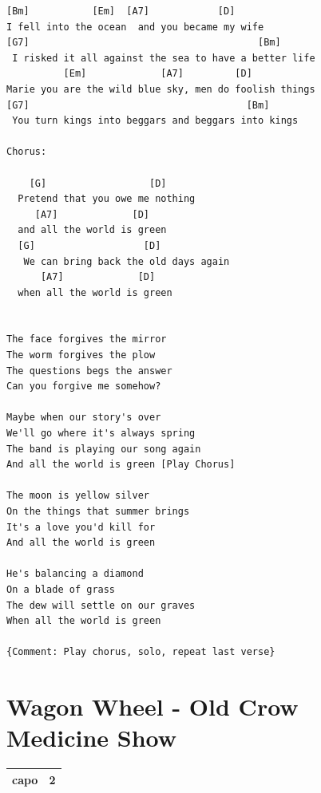 \documentclass[
]{book}
\let\stdsection\section
\renewcommand\section{\clearpage\stdsection}
\begin{document}
\begin{verbatim}
[Bm]           [Em]  [A7]            [D]
I fell into the ocean  and you became my wife
[G7]                                        [Bm]
 I risked it all against the sea to have a better life
          [Em]             [A7]         [D]
Marie you are the wild blue sky, men do foolish things
[G7]                                      [Bm]
 You turn kings into beggars and beggars into kings

Chorus:
  
    [G]                  [D] 
  Pretend that you owe me nothing      
     [A7]             [D]
  and all the world is green
  [G]                   [D]        
   We can bring back the old days again     
      [A7]             [D]
  when all the world is green
  

The face forgives the mirror
The worm forgives the plow
The questions begs the answer
Can you forgive me somehow?

Maybe when our story's over
We'll go where it's always spring
The band is playing our song again
And all the world is green [Play Chorus]

The moon is yellow silver
On the things that summer brings
It's a love you'd kill for
And all the world is green

He's balancing a diamond
On a blade of grass
The dew will settle on our graves
When all the world is green

{Comment: Play chorus, solo, repeat last verse}
\end{verbatim}

\hypertarget{selected-songs-wagon-wheel}{%
\section{Wagon Wheel - Old Crow Medicine Show}\label{selected-songs-wagon-wheel}}

\begin{longtable}[]{@{}ll@{}}
\toprule
\endhead
capo & 2\tabularnewline
\bottomrule
\end{longtable}
\end{document}
